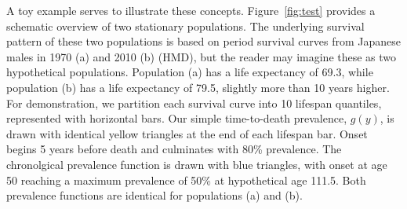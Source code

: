 \documentclass[11pt,oneside,a4paper]{article} %
\begin{document}
A toy example serves to illustrate these concepts. Figure~\ref{fig:test}
provides a schematic overview of two stationary populations. The
underlying survival pattern of these two populations is based on period survival
curves from Japanese males in 1970 (a) and 2010 (b) (HMD), but the reader may
imagine these as two hypothetical populations. Population (a) has a life
expectancy of 69.3, while population (b) has a life expectancy of 79.5, slightly
more than 10 years higher. For demonstration, we partition each survival curve
into 10 lifespan quantiles, represented with horizontal bars. Our simple
time-to-death prevalence, $g(y)$, is drawn with identical yellow triangles at
the end of each lifespan bar. Onset begins 5 years before death and culminates with 80\%
prevalence. The chronolgical prevalence function is drawn with blue triangles,
with onset at age 50 reaching a maximum prevalence of 50\% at hypothetical age
111.5. Both prevalence functions are identical for populations (a) and (b). 
\end{document}
